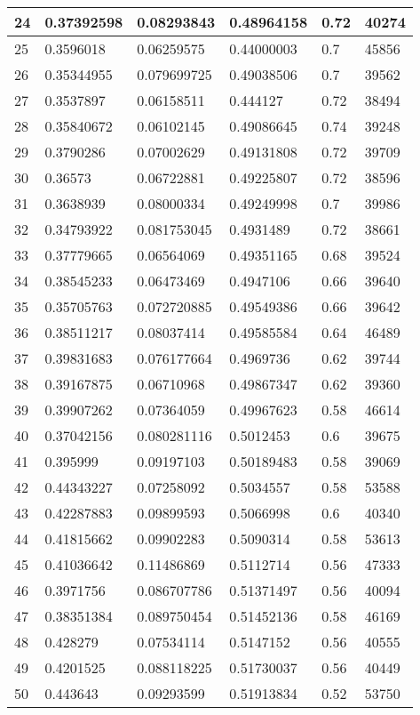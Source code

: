 \begin{longtable}{|l|l|l|l|l|l|}
24 & 0.37392598 & 0.08293843 & 0.48964158 & 0.72 & 40274 \\ \hline 
25 & 0.3596018 & 0.06259575 & 0.44000003 & 0.7 & 45856 \\ \hline 
26 & 0.35344955 & 0.079699725 & 0.49038506 & 0.7 & 39562 \\ \hline 
27 & 0.3537897 & 0.06158511 & 0.444127 & 0.72 & 38494 \\ \hline 
28 & 0.35840672 & 0.06102145 & 0.49086645 & 0.74 & 39248 \\ \hline 
29 & 0.3790286 & 0.07002629 & 0.49131808 & 0.72 & 39709 \\ \hline 
30 & 0.36573 & 0.06722881 & 0.49225807 & 0.72 & 38596 \\ \hline 
31 & 0.3638939 & 0.08000334 & 0.49249998 & 0.7 & 39986 \\ \hline 
32 & 0.34793922 & 0.081753045 & 0.4931489 & 0.72 & 38661 \\ \hline 
33 & 0.37779665 & 0.06564069 & 0.49351165 & 0.68 & 39524 \\ \hline 
34 & 0.38545233 & 0.06473469 & 0.4947106 & 0.66 & 39640 \\ \hline 
35 & 0.35705763 & 0.072720885 & 0.49549386 & 0.66 & 39642 \\ \hline 
36 & 0.38511217 & 0.08037414 & 0.49585584 & 0.64 & 46489 \\ \hline 
37 & 0.39831683 & 0.076177664 & 0.4969736 & 0.62 & 39744 \\ \hline 
38 & 0.39167875 & 0.06710968 & 0.49867347 & 0.62 & 39360 \\ \hline 
39 & 0.39907262 & 0.07364059 & 0.49967623 & 0.58 & 46614 \\ \hline 
40 & 0.37042156 & 0.080281116 & 0.5012453 & 0.6 & 39675 \\ \hline 
41 & 0.395999 & 0.09197103 & 0.50189483 & 0.58 & 39069 \\ \hline 
42 & 0.44343227 & 0.07258092 & 0.5034557 & 0.58 & 53588 \\ \hline 
43 & 0.42287883 & 0.09899593 & 0.5066998 & 0.6 & 40340 \\ \hline 
44 & 0.41815662 & 0.09902283 & 0.5090314 & 0.58 & 53613 \\ \hline 
45 & 0.41036642 & 0.11486869 & 0.5112714 & 0.56 & 47333 \\ \hline 
46 & 0.3971756 & 0.086707786 & 0.51371497 & 0.56 & 40094 \\ \hline 
47 & 0.38351384 & 0.089750454 & 0.51452136 & 0.58 & 46169 \\ \hline 
48 & 0.428279 & 0.07534114 & 0.5147152 & 0.56 & 40555 \\ \hline 
49 & 0.4201525 & 0.088118225 & 0.51730037 & 0.56 & 40449 \\ \hline 
50 & 0.443643 & 0.09293599 & 0.51913834 & 0.52 & 53750 \\ \hline 
\end{longtable}